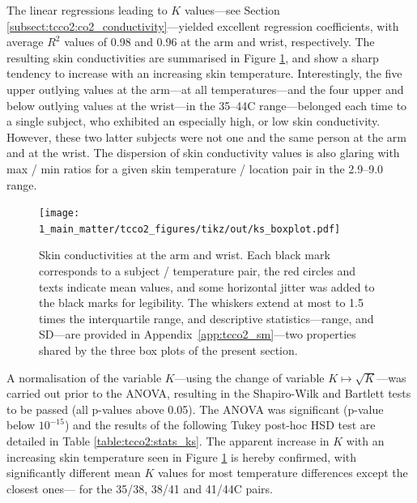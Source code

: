 The linear regressions leading to $K$ values---see Section \ref{subsect:tcco2:co2_conductivity}---yielded excellent regression coefficients, with average $R^2$ values of 0.98 and 0.96 at the arm and wrist, respectively. The resulting skin conductivities are summarised in Figure \ref{fig:tcco2:ks_boxplot}, and show a sharp tendency to increase with an increasing skin temperature. Interestingly, the five upper outlying values at the arm---at all temperatures---and the four upper and below outlying values at the wrist---in the 35--44{\degree}C range---belonged each time to a single subject, who exhibited an especially high, or low skin conductivity. However, these two latter subjects were not one and the same person at the arm and at the wrist. The dispersion of skin conductivity values is also glaring with max / min ratios for a given skin temperature / location pair in the 2.9--9.0 range.

\begin{figure}
	\centering
	\texttt{[image: 1\_main\_matter/tcco2\_figures/tikz/out/ks\_boxplot.pdf]}
	\caption[Skin conductivities at the arm and wrist (box plots).]{Skin conductivities at the arm and wrist. Each black mark corresponds to a subject / temperature pair, the red circles and texts indicate mean values, and some horizontal jitter was added to the black marks for legibility. The whiskers extend at most to 1.5 times the interquartile range, and descriptive statistics---range, and SD---are provided in Appendix~\ref{app:tcco2_sm}---two properties shared by the three box plots of the present section.}\label{fig:tcco2:ks_boxplot}
\end{figure}

A normalisation of the variable $K$---using the change of variable $K\mapsto\sqrt{K}$---was carried out prior to the ANOVA, resulting in the Shapiro-Wilk and Bartlett tests to be passed (all p-values above 0.05). The ANOVA was significant (p-value below $10^{-15}$) and the results of the following Tukey post-hoc HSD test are detailed in Table \ref{table:tcco2:stats_ks}. The apparent increase in $K$ with an increasing skin temperature seen in Figure \ref{fig:tcco2:ks_boxplot} is hereby confirmed, with significantly different mean $K$ values for most temperature differences except the closest ones---\ie{} for the 35/38, 38/41 and 41/44{\degree}C pairs.

